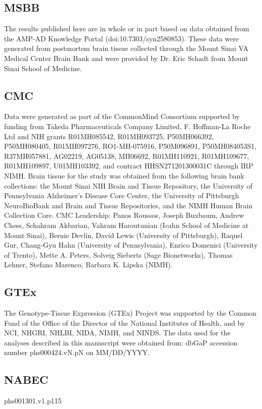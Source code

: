\subsection{MSBB}
The results published here are in whole or in part based on data obtained from the AMP-AD Knowledge Portal (doi:10.7303/syn2580853). These data were generated from postmortem brain tissue collected through the Mount Sinai VA Medical Center Brain Bank and were provided by Dr. Eric Schadt from Mount Sinai School of Medicine. 

\subsection{CMC}

Data were generated as part of the CommonMind Consortium supported by funding from Takeda Pharmaceuticals Company Limited, F. Hoffman-La Roche Ltd and NIH grants R01MH085542, R01MH093725, P50MH066392, P50MH080405, R01MH097276, RO1-MH-075916, P50M096891, P50MH084053S1, R37MH057881, AG02219, AG05138, MH06692, R01MH110921, R01MH109677, R01MH109897, U01MH103392, and contract HHSN271201300031C through IRP NIMH. Brain tissue for the study was obtained from the following brain bank collections: the Mount Sinai NIH Brain and Tissue Repository, the University of Pennsylvania Alzheimer’s Disease Core Center, the University of Pittsburgh NeuroBioBank and Brain and Tissue Repositories, and the NIMH Human Brain Collection Core. CMC Leadership: Panos Roussos, Joseph Buxbaum, Andrew Chess, Schahram Akbarian, Vahram Haroutunian (Icahn School of Medicine at Mount Sinai), Bernie Devlin, David Lewis (University of Pittsburgh), Raquel Gur, Chang-Gyu Hahn (University of Pennsylvania), Enrico Domenici (University of Trento), Mette A. Peters, Solveig Sieberts (Sage Bionetworks), Thomas Lehner, Stefano Marenco, Barbara K. Lipska (NIMH). 

\subsection{GTEx}

The Genotype-Tissue Expression (GTEx) Project was supported by the Common Fund of the Office of the Director of the National Institutes of Health, and by NCI, NHGRI, NHLBI, NIDA, NIMH, and NINDS. The data used for the analyses described in this manuscript were obtained from:  dbGaP accession number phs000424.vN.pN on MM/DD/YYYY. 

\subsection{NABEC}
phs001301.v1.p115 

